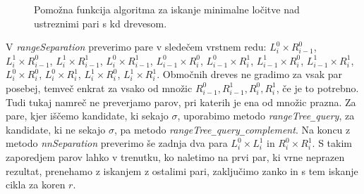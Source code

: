 \documentclass[a4paper, 12pt]{book}
\newcommand{\U}{\texttt{\_}}
\begin{document}
\begin{figure}[htp]
\begin{center}
\end{center}
\caption{Pomožna funkcija algoritma za iskanje minimalne ločitve nad ustreznimi pari s kd drevesom.}
\label{fig:sep-overall-2}
\end{figure}

V \textit{rangeSeparation} preverimo pare v sledečem vrstnem redu: $L_i^0\times R_{i-1}^0$, $L_i^1\times R_{i-1}^0$, $L_i^1\times R_{i-1}^1$, $L_i^0\times R_{i-1}^1$, $L_{i-1}^0\times R_{i}^0$, $L_{i-1}^0\times R_{i}^1$, $L_{i-1}^1\times R_{i}^0$, $L_{i-1}^1\times R_{i}^1$, $L_{i}^0\times R_{i}^0$, $L_{i}^0\times R_{i}^1$, $L_{i}^1\times R_{i}^0$, $L_{i}^1\times R_{i}^1$. Območnih dreves ne gradimo za vsak par posebej, temveč enkrat za vsako od množic $R_{i-1}^0, R_{i-1}^1, R_{i}^0, R_{i}^1$, če je to potrebno. Tudi tukaj namreč ne preverjamo parov, pri katerih je ena od množic prazna. Za pare, kjer iščemo kandidate, ki sekajo $\sigma$, uporabimo metodo \textit{rangeTree\U query}, za kandidate, ki ne sekajo $\sigma$, pa metodo \textit{rangeTree\U query\U complement}. Na koncu z metodo \textit{nnSeparation} preverimo še zadnja dva para $L_i^0\times L_i^1$ in $R_i^0\times R_i^1$. S takim zaporedjem parov lahko v trenutku, ko naletimo na prvi par, ki vrne neprazen rezultat, prenehamo z iskanjem z ostalimi pari, zaključimo zanko in s tem iskanje cikla za koren $r$.
\end{document}
